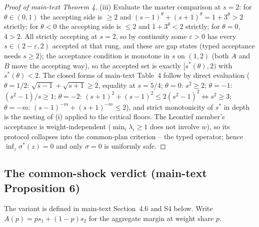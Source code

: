 \documentclass[preprint,11pt,authoryear]{elsarticle}
\theoremstyle{remark}
\begin{document}
\begin{proof}[Proof of main-text Theorem 4]
(iii) Evaluate the master comparison at $s=2$: for $\theta\in(0,1)$ the accepting side is $\ge2$ and $(s-1)^\theta+(s+1)^\theta=1+3^\theta>2$ strictly; for $\theta<0$ the accepting side is $\le2$ and $1+3^\theta<2$ strictly; for $\theta=0$, $4>2$. All strictly accepting at $s=2$, so by continuity some $\varepsilon>0$ has every $s\in(2-\varepsilon,2)$ accepted at that rung, and these are gap states (typed acceptance needs $s\ge2$); the acceptance condition is monotone in $s$ on $(1,2)$ (both $A$ and $B$ move the accepting way), so the accepted set is exactly $[s^*(\theta),2)$ with $s^*(\theta)<2$. The closed forms of main-text Table~4 follow by direct evaluation ($\theta=1/2$: $\sqrt{s-1}+\sqrt{s+1}\ge2$, equality at $s=5/4$; $\theta=0$: $s^2\ge2$; $\theta=-1$: $(s^2-1)/s\ge1$; $\theta=-2$: $(s+1)^2+(s-1)^2\le2(s^2-1)^2\iff s^2\ge3$; $\theta=-m$: $(s-1)^{-m}+(s+1)^{-m}\le2$), and strict monotonicity of $s^*$ in depth is the nesting of (i) applied to the critical floors. The Leontief member's acceptance is weight-independent ($\min_i\lambda_i\ge1$ does not involve $w$), so its protocol collapses into the common-plan criterion -- the typed operator; hence $\inf_z\sigma^*(z)=0$ and only $\sigma=0$ is uniformly safe.
\end{proof}

\subsection{The common-shock verdict (main-text Proposition 6)}\label{si:csproofs}

The variant is defined in main-text Section~4.6 and S4 below. Write $A(p)=ps_1+(1-p)s_2$ for the aggregate margin at weight share $p$.
\end{document}
